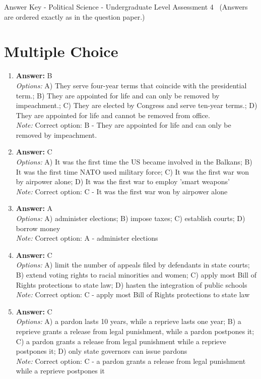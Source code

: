 \documentclass[12pt]{article}
\begin{document}
\begin{center}
Answer Key - Political Science - Undergraduate Level Assessment 4 \
\small (Answers are ordered exactly as in the question paper.)
\end{center}

\section*{Multiple Choice}
\begin{enumerate}[label=\arabic*.]
\item \textbf{Answer:} B
\\ \textit{Options:} A) They serve four-year terms that coincide with the presidential term.; B) They are appointed for life and can only be removed by impeachment.; C) They are elected by Congress and serve ten-year terms.; D) They are appointed for life and cannot be removed from office.
\\ \textit{Note:} Correct option: B - They are appointed for life and can only be removed by impeachment.
\item \textbf{Answer:} C
\\ \textit{Options:} A) It was the first time the US became involved in the Balkans; B) It was the first time NATO used military force; C) It was the first war won by airpower alone; D) It was the first war to employ 'smart weapons'
\\ \textit{Note:} Correct option: C - It was the first war won by airpower alone
\item \textbf{Answer:} A
\\ \textit{Options:} A) administer elections; B) impose taxes; C) establish courts; D) borrow money
\\ \textit{Note:} Correct option: A - administer elections
\item \textbf{Answer:} C
\\ \textit{Options:} A) limit the number of appeals filed by defendants in state courts; B) extend voting rights to racial minorities and women; C) apply most Bill of Rights protections to state law; D) hasten the integration of public schools
\\ \textit{Note:} Correct option: C - apply most Bill of Rights protections to state law
\item \textbf{Answer:} C
\\ \textit{Options:} A) a pardon lasts 10 years, while a reprieve lasts one year; B) a reprieve grants a release from legal punishment, while a pardon postpones it; C) a pardon grants a release from legal punishment while a reprieve postpones it; D) only state governors can issue pardons
\\ \textit{Note:} Correct option: C - a pardon grants a release from legal punishment while a reprieve postpones it
\end{enumerate}
\end{document}
